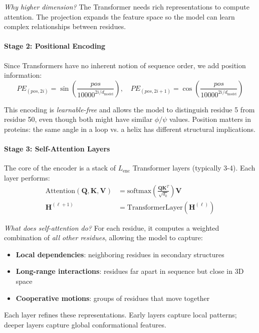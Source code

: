 \documentclass[12pt,a4paper]{article}
\begin{document}
\textit{Why higher dimension?} The Transformer needs rich representations to compute attention. The projection expands the feature space so the model can learn complex relationships between residues.

\paragraph{Stage 2: Positional Encoding}
Since Transformers have no inherent notion of sequence order, we add position information:
\begin{equation}
PE_{(pos, 2i)} = \sin\left(\frac{pos}{10000^{2i/d_{\text{model}}}}\right), \quad
PE_{(pos, 2i+1)} = \cos\left(\frac{pos}{10000^{2i/d_{\text{model}}}}\right)
\end{equation}

This encoding is \textit{learnable-free} and allows the model to distinguish residue 5 from residue 50, even though both might have similar $\phi/\psi$ values. Position matters in proteins: the same angle in a loop vs. a helix has different structural implications.

\paragraph{Stage 3: Self-Attention Layers}
The core of the encoder is a stack of $L_{\text{enc}}$ Transformer layers (typically 3-4). Each layer performs:
\begin{align}
\text{Attention}(\mathbf{Q}, \mathbf{K}, \mathbf{V}) &= \text{softmax}\left(\frac{\mathbf{Q}\mathbf{K}^T}{\sqrt{d_k}}\right)\mathbf{V} \\
\mathbf{H}^{(\ell+1)} &= \text{TransformerLayer}(\mathbf{H}^{(\ell)})
\end{align}

\textit{What does self-attention do?} For each residue, it computes a weighted combination of \textit{all other residues}, allowing the model to capture:
\begin{itemize}
    \item \textbf{Local dependencies}: neighboring residues in secondary structures
    \item \textbf{Long-range interactions}: residues far apart in sequence but close in 3D space
    \item \textbf{Cooperative motions}: groups of residues that move together
\end{itemize}

Each layer refines these representations. Early layers capture local patterns; deeper layers capture global conformational features.
\end{document}
